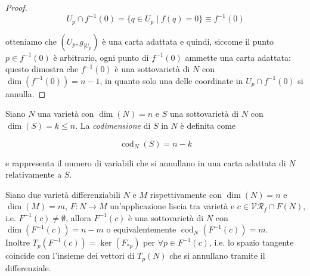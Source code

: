 \begin{proof}
	\begin{equation}
		U_{p} \cap f^{-1}(0) = \{ q \in U_{p} \mid f(q)=0 \} \equiv f^{-1}(0)
	\end{equation}

	otteniamo che $ (U_{p},g_{|U_{p}}) $ è una carta adattata e quindi, siccome il punto $ p \in f^{-1}(0) $ è arbitrario, ogni punto di $ f^{-1}(0) $ ammette una carta adattata: questo dimostra che $ f^{-1}(0) $ è una sottovarietà di $ N $ con $ \dim(f^{-1}(0)) = n-1 $, in quanto solo una delle coordinate in $ U_{p} \cap f^{-1}(0) $ si annulla.
\end{proof}

\begin{definition}
	Siano $ N $ una varietà con $ \dim(N)=n $ e $ S $ una sottovarietà di $ N $ con $ \dim(S)=k \leqslant n $. La \textit{codimensione} di $ S $ in $ N $ è definita come
	
	\begin{equation}
		\operatorname{cod}_{N}(S) = n-k
	\end{equation}

	e rappresenta il numero di variabili che si annullano in una carta adattata di $ N $ relativamente a $ S $.
\end{definition}

\begin{theorem}
	Siano due varietà differenziabili $ N $ e $ M $ rispettivamente con $ \dim(N)=n $ e $ \dim(M)=m $, $ F : N \to M $ un'applicazione liscia tra varietà e $ c \in \mathcal{VR}_{f} \cap F(N) $, i.e. $ F^{-1}(c) \neq \emptyset $, allora $ F^{-1}(c) $ è una sottovarietà di $ N $ con $ \dim(F^{-1}(c)) = n-m $ o equivalentemente $ \operatorname{cod}_{N}(F^{-1}(c)) = m $.\\
	Inoltre $ T_{p}(F^{-1}(c)) = \ker(F_{*p}) $ per $ \forall p \in F^{-1}(c) $, i.e. lo spazio tangente coincide con l'insieme dei vettori di $ T_{p}(N) $ che si annullano tramite il differenziale.
\end{theorem}

